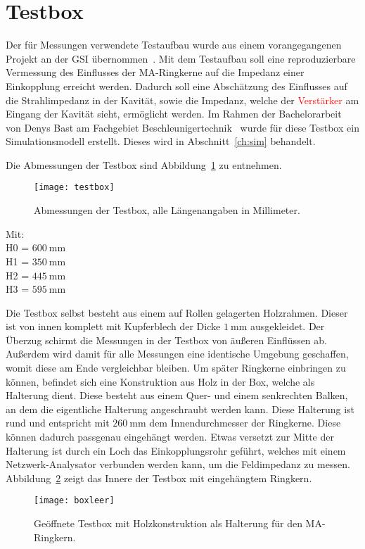\section{Testbox}
\label{sec:testbox}
Der f\"ur Messungen verwendete Testaufbau wurde aus einem vorangegangenen Projekt an der GSI \"ubernommen~\citep{harzheim2016modeling}. Mit dem Testaufbau soll eine reproduzierbare Vermessung des Einflusses der MA-Ringkerne auf die Impedanz einer Einkopplung erreicht werden. Dadurch soll eine Absch\"atzung des Einflusses auf die Strahlimpedanz in der Kavit\"at, sowie die Impedanz, welche der \textcolor{red}{Verst\"arker} am Eingang der Kavit\"at sieht, erm\"oglicht werden. Im Rahmen der Bachelorarbeit von Denys Bast am Fachgebiet Beschleunigertechnik~\citep{bast2017ba} wurde f\"ur diese Testbox ein Simulationsmodell erstellt. Dieses wird in Abschnitt~\ref{ch:sim} behandelt.

\par
Die Abmessungen der Testbox sind Abbildung~\ref{fig:boxdimensions} zu entnehmen.
\par
\begin{figure}[htb]
	\centering
	\texttt{[image: testbox]}
	\caption{Abmessungen der Testbox, alle L\"angenangaben in Millimeter.}
	\label{fig:boxdimensions}
\end{figure}
Mit:\\
H0 = $\SI{600}{\milli\meter}$\\
H1 = $\SI{350}{\milli\meter}$\\
H2 = $\SI{445}{\milli\meter}$\\
H3 = $\SI{595}{\milli\meter}$

Die Testbox selbst besteht aus einem auf Rollen gelagerten Holzrahmen. Dieser ist von innen komplett mit Kupferblech der Dicke $\SI{1}{\milli\meter}$ ausgekleidet. Der Überzug schirmt die Messungen in der Testbox von \"au\ss{}eren Einfl\"ussen ab. Au\ss{}erdem wird damit f\"ur alle Messungen eine identische Umgebung geschaffen, womit diese am Ende vergleichbar bleiben. Um sp\"ater Ringkerne einbringen zu k\"onnen, befindet sich eine Konstruktion aus Holz in der Box, welche als Halterung dient. Diese besteht aus einem Quer- und einem senkrechten Balken, an dem die eigentliche Halterung angeschraubt werden kann. Diese Halterung ist rund und entspricht mit $\SI{260}{\milli\meter}$ dem Innendurchmesser der Ringkerne. Diese k\"onnen dadurch passgenau eingeh\"angt werden. Etwas versetzt zur Mitte der Halterung ist durch ein Loch das Einkopplungsrohr gef\"uhrt, welches mit einem Netzwerk-Analysator verbunden werden kann, um die Feldimpedanz zu messen. Abbildung~\ref{fig:leereBox} zeigt das Innere der Testbox mit eingeh\"angtem Ringkern. 
\par
\begin{figure}[htb]
	\centering
	\texttt{[image: boxleer]}
	\caption{Ge\"offnete Testbox mit Holzkonstruktion als Halterung f\"ur den MA-Ringkern.}
	\label{fig:leereBox}
\end{figure}


